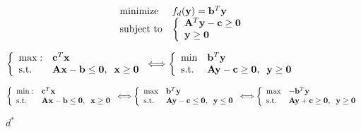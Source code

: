 \documentclass{article}
\def\lthtmlcheckvsize{\ifdim\ht\sizebox<\vsize 
  \ifdim\wd\sizebox<\hsize\expandafter\hfill\fi \expandafter\vfill
  \else\expandafter\vss\fi}%
\begin{document}
{\newpage\clearpage
{}%
\begin{displaymath}\begin{array}{ll}
\mbox{minimize} & f_d({\bf y})={\bf b}^T{\bf y}\\
\mbox{subject to} & \left\{\begin{array}{l}
{\bf A}^T{\bf y}-{\bf c}\ge {\bf0}\\
{\bf y}\ge {\bf0}\end{array}\right.\\
\end{array}\end{displaymath}%
\lthtmldisplayZ
\lthtmlcheckvsize\clearpage}

{\newpage\clearpage
{}%
$\displaystyle \left\{\begin{array}{ll}\mbox{max}: & {\bf c}^T{\bf x}\\
\mbox{s.t.} & {\bf Ax}-{\bf b}\le{\bf0},\;\;{\bf x}\ge{\bf0}\end{array}\right.
\Longleftrightarrow
\left\{\begin{array}{ll}\mbox{min} & {\bf b}^T{\bf y}\\
\mbox{s.t.} & {\bf Ay}-{\bf c}\ge{\bf0},\;\;{\bf y}\ge{\bf0}\end{array}\right.$%
\lthtmlindisplaymathZ
\lthtmlcheckvsize\clearpage}

{\newpage\clearpage
{}%
$\displaystyle \left\{\begin{array}{ll}\mbox{min}: & {\bf c}^T{\bf x}\\
\mbox{s.t.} & {\bf Ax}-{\bf b}\le{\bf0},\;\;{\bf x}\ge{\bf0}\end{array}\right.
\Longleftrightarrow
\left\{\begin{array}{ll}\mbox{max} & {\bf b}^T{\bf y}\\
\mbox{s.t.} & {\bf Ay}-{\bf c}\le{\bf0},\;\;{\bf y}\le{\bf0}\end{array}\right.
\Longleftrightarrow
\left\{\begin{array}{ll}\mbox{max} & -{\bf b}^T{\bf y}\\
\mbox{s.t.} & {\bf Ay}+{\bf c}\ge{\bf0},\;\;{\bf y}\ge{\bf0}\end{array}\right.$%
\lthtmlindisplaymathZ
\lthtmlcheckvsize\clearpage}

{\newpage\clearpage
{}%
$ d^*$%
\lthtmlindisplaymathZ
\lthtmlcheckvsize\clearpage}
\end{document}
